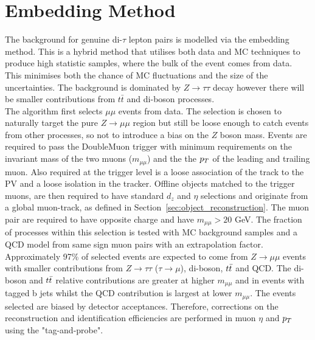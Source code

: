 \newpage
\section{Embedding Method}
\label{sec:embedding}

The background for genuine di-$\tau$ lepton pairs is modelled via the embedding method. 
This is a hybrid method that utilises both data and MC techniques to produce high statistic samples, where the bulk of the event comes from data.
This minimises both the chance of MC fluctuations and the size of the uncertainties.
The background is dominated by $Z \rightarrow \tau \tau$ decay however there will be smaller contributions from $t\bar{t}$ and di-boson processes.  \\

The algorithm first selects $\mu\mu$ events from data.
The selection is chosen to naturally target the pure $Z \rightarrow \mu\mu$ region but still be loose enough to catch events from other processes, so not to introduce a bias on the $Z$ boson mass.
Events are required to pass the DoubleMuon trigger with minimum requirements on the invariant mass of the two muons ($m_{\mu\mu}$) and the the $p_{T}$ of the leading and trailing muon.
Also required at the trigger level is a loose association of the track to the PV and a loose isolation in the tracker.
Offline objects matched to the trigger muons, are then required to have standard $d_z$ and $\eta$ selections and originate from a global muon-track, as defined in Section~\ref{sec:object_reconstruction}.
The muon pair are required to have opposite charge and have $m_{\mu\mu} > 20$ GeV.
The fraction of processes within this selection is tested with MC background samples and a QCD model from same sign muon pairs with an extrapolation factor.
Approximately 97\% of selected events are expected to come from $Z\rightarrow \mu\mu$ events with smaller contributions from $Z \rightarrow \tau\tau$ ($\tau\rightarrow\mu$), di-boson, $t\bar{t}$ and QCD.
The di-boson and $t\bar{t}$ relative contributions are greater at higher $m_{\mu\mu}$ and in events with tagged b jets whilst the QCD contribution is largest at lower $m_{\mu\mu}$.
The events selected are biased by detector acceptances. 
Therefore, corrections on the reconstruction and identification efficiencies are performed in muon $\eta$ and $p_{T}$ using the "tag-and-probe". \\

